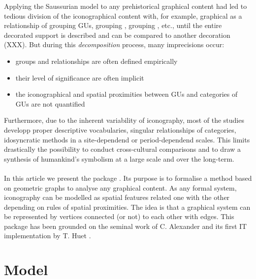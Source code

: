 \documentclass[article]{jss}
\begin{document}
Applying the Saussurian model to any prehistorical graphical content had led to tedious division of the iconographical content with, for example, graphical as a relationship of  grouping GUs,  grouping ,  grouping , etc., until the entire decorated support is described and can be compared to another decoration (XXX). But during this \emph{decomposition} process, many imprecisions occur:
\begin{itemize}
  \item groups and relationships are often defined empirically
  \item their level of significance are often implicit 
  \item the iconographical and spatial proximities between GUs and categories of GUs are not quantified
\end{itemize}

Furthermore, due to the inherent variability of iconography, most of the studies developp proper descriptive vocabularies, singular relationships of categories, idosyncratic methods in a site-dependend or period-dependend scales. This limits drastically the possibility to conduct cross-cultural comparisons and to draw a synthesis of humankind's symbolism at a large scale and over the long-term. 
\\
\\
In this article we present the  package . Its purpose is to formalise a method based on geometric graphs to analyse any graphical content. As any formal system, iconography can be modelled as spatial features related one with the other depending on rules of spatial proximities. The idea is that a graphical system can be represented by vertices connected (or not) to each other with edges. This package has been grounded on the seminal work of C. Alexander \citep{Alexander08} and its first IT implementation by T. Huet \citep{Huet18a}. 

\section[Model]{Model} \label{sec:model}
\end{document}
